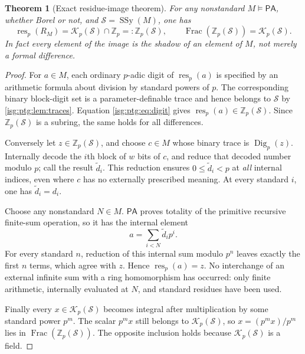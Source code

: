 \documentclass[11pt]{article}
\newtheorem{theorem}{Theorem}[section]
\theoremstyle{definition}
\theoremstyle{remark}
\newcommand{\res}{\operatorname{res}}
\newcommand{\Zp}{\mathbb{Z}_p}
\newcommand{\PA}{\mathsf{PA}}
\newcommand{\SSy}{\operatorname{SSy}}
\newcommand{\Frac}{\operatorname{Frac}}
\newcommand{\Dig}{\operatorname{Dig}}
\begin{document}
\begin{theorem}[Exact residue-image theorem]\label{isg:ptg:thm:residue}
For any nonstandard $M\models\PA$, whether Borel or not, and
$\mathcal S=\SSy(M)$, one has
\begin{equation}\label{isg:ptg:eq:exact}
 \res_p(R_M)=\mathcal K_p(\mathcal S)\cap\Zp=:\Zp(\mathcal S),\qquad
 \Frac(\Zp(\mathcal S))=\mathcal K_p(\mathcal S).
\end{equation}
In fact every element of the image is the shadow of an element of $M$, not
merely a formal difference.
\end{theorem}
\begin{proof}
For $a\in M$, each ordinary $p$-adic digit of $\res_p(a)$ is specified by
an arithmetic formula about division by standard powers of $p$. The
corresponding binary block-digit set is a parameter-definable trace and
hence belongs to $\mathcal S$ by \cref{isg:ptg:lem:traces}. Equation
\eqref{isg:ptg:eq:digit} gives $\res_p(a)\in\Zp(\mathcal S)$. Since
$\Zp(\mathcal S)$ is a subring, the same holds for all differences.

Conversely let $z\in\Zp(\mathcal S)$, and choose $c\in M$ whose binary
trace is $\Dig_p(z)$. Internally decode the $i$th block of $w$ bits of $c$,
and reduce that decoded number modulo $p$; call the result $\tilde d_i$. This
reduction ensures $0\leq \tilde d_i<p$ at \emph{all} internal indices, even where
$c$ has no externally prescribed meaning. At every standard $i$, one has
$\tilde d_i=d_i$.

Choose any nonstandard $N\in M$. $\PA$ proves totality of the primitive
recursive finite-sum operation, so it has the internal element
\[
 a=\sum_{i<N}\tilde d_i p^i.
\]
For every standard $n$, reduction of this internal sum modulo $p^n$ leaves
exactly the first $n$ terms, which agree with $z$. Hence $\res_p(a)=z$. No
interchange of an external infinite sum with a ring homomorphism has
occurred: only finite arithmetic, internally evaluated at $N$, and standard
residues have been used.

Finally every $x\in\mathcal K_p(\mathcal S)$ becomes integral after
multiplication by some standard power $p^m$. The scalar $p^mx$ still
belongs to $\mathcal K_p(\mathcal S)$, so $x=(p^mx)/p^m$ lies in
$\Frac(\Zp(\mathcal S))$. The opposite inclusion holds because
$\mathcal K_p(\mathcal S)$ is a field.
\end{proof}
\end{document}
